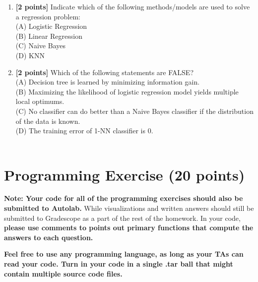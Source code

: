 \documentclass{article}
\newenvironment{soln}{
	\leavevmode\color{blue}\ignorespaces
}{}
\begin{document}
\begin{enumerate}
\begin{soln}
    \end{soln}
	
	\item \textbf{[2 points]} Indicate which of the following methods/models are used to solve a regression problem: \\
    (A) Logistic Regression \\
    (B) Linear Regression \\
    (C) Naive Bayes \\
    (D) KNN
    \\
    \begin{soln}

    \end{soln}

    \item \textbf{[2 points]} Which of the following statements are FALSE? \\
    (A) Decision tree is learned by minimizing information gain. \\
    (B) Maximizing the likelihood of logistic regression model yields multiple local optimums. \\
    (C) No classifier can do better than a Naive Bayes classifier if the distribution of the data is known. \\
    (D) The training error of 1-NN classifier is 0. \\
    \\
    \begin{soln}

    \end{soln}

\end{enumerate}

\newpage

\section{Programming Exercise (20 points)}
\begin{framed}
\textbf{Note: Your code for all of the programming exercises should also be submitted to Autolab.} While visualizations and written answers should still be submitted to Gradescope as a part of the rest of the homework. In your code, \textbf{please use comments to points out primary functions that compute the answers to each question.} 

\textbf{Feel free to use any programming language, as long as your TAs can read your code. Turn in your code in a single .tar ball that might contain multiple source code files.}
\end{framed}
\end{document}
